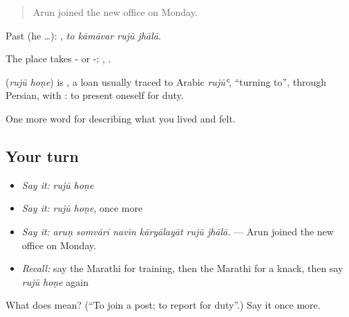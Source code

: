 \begin{quote}
Arun joined the new office on Monday.
\end{quote}

Past (he …):    , \emph{to kāmāvar rujū jhālā}.

The place takes - or -:   ,   .

\begin{cousinweb}
\textbf{ } (\emph{rujū hoṇe}) is , a loan usually traced to Arabic \emph{rujūʿ}, \textquotedblleft{}turning to\textquotedblright{}, through Persian, with : to present oneself for duty.
\end{cousinweb}

\begin{grammarlens}[title={What you've built}]
One more word for describing what you lived and felt.
\end{grammarlens}

\subsection*{Your turn}
\begin{itemize}
\raggedright
  \item \emph{Say it:} \emph{rujū hoṇe}
  \item \emph{Say it:} \emph{rujū hoṇe}, once more
  \item \emph{Say it:} \emph{aruṇ somvārī navīn kāryālayāt rujū jhālā.} — Arun joined the new office on Monday.
  \item \emph{Recall:} say the Marathi for training, then the Marathi for a knack, then say \emph{rujū hoṇe} again
\end{itemize}

\begin{tcolorbox}[breakable,colback=teal!4,colframe=teal!35!black,title={Before you move on}]
What does   mean? (\textquotedblleft{}To join a post; to report for duty\textquotedblright{}.) Say it once more.
\end{tcolorbox}
